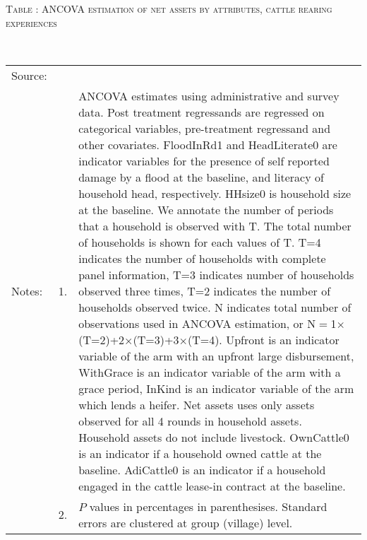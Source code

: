 \vspace{-1cm}\hspace{-1cm}\begin{minipage}[t]{14cm}
\hfil\textsc{\normalsize Table \thetable: ANCOVA estimation of net assets by attributes, cattle rearing experiences\label{tab ANCOVA narrow net assets Experience attributes}}\\
\setlength{\tabcolsep}{1pt}
\setlength{\baselineskip}{8pt}
\renewcommand{\arraystretch}{.52}
\hfil{}\\
\renewcommand{\arraystretch}{.8}
\setlength{\tabcolsep}{1pt}
\begin{tabular}{>{\hfill\scriptsize}p{1cm}<{}>{\hfill\scriptsize}p{.25cm}<{}>{\scriptsize}p{12cm}<{\hfill}}
Source:& \multicolumn{2}{l}{\scriptsize Estimated with GUK administrative and survey data.}\\
Notes: & 1. & ANCOVA estimates using administrative and survey data. Post treatment regressands are regressed on categorical variables, pre-treatment regressand and other covariates. \textsf{FloodInRd1} and \textsf{HeadLiterate0} are indicator variables for the presence of self reported damage by a flood at the baseline, and literacy of household head, respectively. \textsf{HHsize0} is household size at the baseline. We annotate the number of periods that a household is observed with \textsf{T}. The total number of households is shown for each values of \textsf{T}. \textsf{T=4} indicates the number of households with complete panel information, \textsf{T=3} indicates number of households observed three times, \textsf{T=2} indicates the number of households observed twice. \textsf{N} indicates total number of observations used in ANCOVA estimation, or \textsf{N$=$1$\times$(T=2)+2$\times$(T=3)+3$\times$(T=4)}.  \textsf{Upfront} is an indicator variable of the arm with an upfront large disbursement, \textsf{WithGrace} is an indicator variable of the arm with a grace period, \textsf{InKind} is an indicator variable of the arm which lends a heifer. Net assets uses only assets observed for all 4 rounds in household assets. Household assets do not include livestock. \textsf{OwnCattle0} is an indicator if a household owned cattle at the baseline. \textsf{AdiCattle0} is an indicator if a household engaged in the cattle lease-in contract at the baseline.  \\
& 2. & $P$ values in percentages in parenthesises. Standard errors are clustered at group (village) level.
\end{tabular}
\end{minipage}

